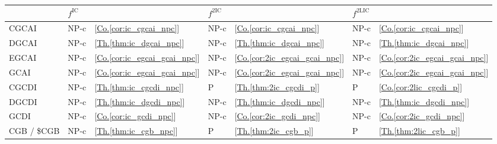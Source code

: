 \documentclass[
    12pt,               %
    a4paper,            %
    bibtotoc,           %
    pointlessnumbers,   %
    ngerman,            %
    titlepage,          %
    leqno,              %
    ]{scrarticle}       %
\newcommand\ttref[1]{[\hyperref[#1]{Th.\thinspace\ref*{#1}}]}
\newcommand\ccref[1]{[\hyperref[#1]{Co.\thinspace\ref*{#1}}]}
\begin{document}
\begin{table}[!htb]
\begin{tabularx}{\textwidth}{
p{}
p{}
X
p{}
X
p{}
X
}
\hline & \multicolumn{2}{l}{$f^{\text{IC}}$} & \multicolumn{2}{l}{$f^{\text{2IC}}$} & \multicolumn{2}{l}{$f^{\text{2LIC}}$} \\
\hline

CGCAI &
NP-c                            & \ccref{cor:ic_cgcai_npc} &
NP-c                            & \ccref{cor:ic_cgcai_npc} &
NP-c                            & \ccref{cor:ic_cgcai_npc} \\

DGCAI &
NP-c                            & \ttref{thm:ic_dgcai_npc} &
NP-c                            & \ttref{thm:ic_dgcai_npc} &
NP-c                            & \ttref{thm:ic_dgcai_npc} \\

EGCAI &
NP-c                            & \ccref{cor:ic_egcai_gcai_npc} &
NP-c                            & \ccref{cor:2ic_egcai_gcai_npc} &
NP-c                            & \ccref{cor:2ic_egcai_gcai_npc} \\

GCAI &
NP-c                            & \ccref{cor:ic_egcai_gcai_npc} &
NP-c                            & \ccref{cor:2ic_egcai_gcai_npc} &
NP-c                            & \ccref{cor:2ic_egcai_gcai_npc} \\

\hline

CGCDI &
NP-c                            & \ttref{thm:ic_cgcdi_npc} &
P                               & \ttref{thm:2ic_cgcdi_p} &
P                               & \ccref{cor:2lic_cgcdi_p} \\

DGCDI &
NP-c                            & \ttref{thm:ic_dgcdi_npc} &
NP-c                            & \ttref{thm:ic_dgcdi_npc} &
NP-c                            & \ttref{thm:ic_dgcdi_npc} \\

GCDI &
NP-c                            & \ccref{cor:ic_gcdi_npc} &
NP-c                            & \ccref{cor:2ic_gcdi_npc} &
NP-c                            & \ccref{cor:2ic_gcdi_npc} \\

\hline

CGB / \$CGB &
NP-c                            & \ttref{thm:ic_cgb_npc} &
P                               & \ttref{thm:2ic_cgb_p} &
P                               & \ttref{thm:2lic_cgb_p} \\


\end{tabularx}
\end{table}
\end{document}
